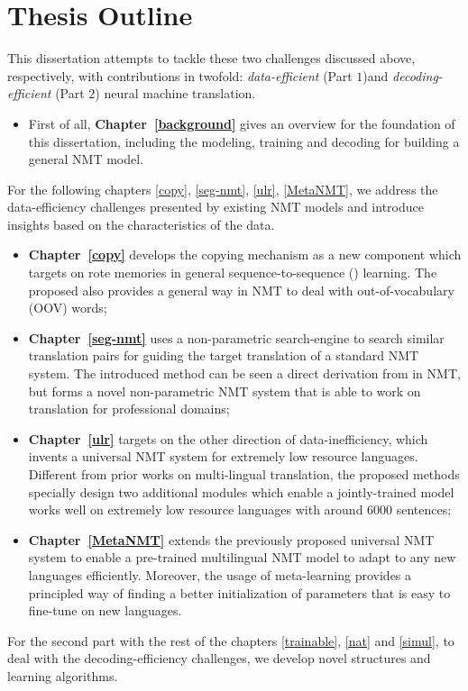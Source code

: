 \section{Thesis Outline}
This dissertation attempts to tackle these two challenges discussed above, respectively, with contributions in twofold: {\it data-efficient} (Part $1$)and {\it decoding-efficient} (Part $2$) neural machine translation. 
\begin{itemize}
\item First of all, \textbf{ Chapter~\ref{background}} gives an overview for the foundation of  this dissertation,  including the modeling, training and decoding for building a general NMT model. 
\end{itemize}
For the following chapters \ref{copy}, \ref{seg-nmt}, \ref{ulr}, \ref{MetaNMT}, we address the data-efficiency challenges presented by existing NMT models and introduce insights based on the characteristics of the data.
\begin{itemize}
\item \textbf{Chapter~\ref{copy}} develops the copying mechanism as a new component  which targets on rote memories in general sequence-to-sequence (\sts) learning. The proposed \copynet also provides a general way in NMT to deal with out-of-vocabulary (OOV) words; 
\item \textbf{Chapter~\ref{seg-nmt}} uses a non-parametric search-engine to search similar translation pairs for guiding the target translation of a standard NMT system. The introduced method can be seen a direct derivation from \copynet in NMT, but forms a novel non-parametric NMT system that is able to work on translation for professional domains; 
\item \textbf{Chapter~\ref{ulr}} targets on the other direction of data-inefficiency, which invents a universal NMT system for extremely low resource languages. Different from prior works on multi-lingual translation, the proposed methods specially design two additional modules which enable a jointly-trained model works well on extremely low resource languages with around 6000 sentences; 
\item \textbf{Chapter~\ref{MetaNMT}} extends the previously proposed universal NMT system to enable a pre-trained multilingual NMT model to adapt to any new languages efficiently. Moreover, the usage of meta-learning provides a principled way of finding a better initialization of parameters that is easy to fine-tune on new languages.
\end{itemize}
For the second part with the rest of the chapters \ref{trainable}, \ref{nat} and \ref{simul}, to deal with the decoding-efficiency challenges, we develop novel structures and learning algorithms.
